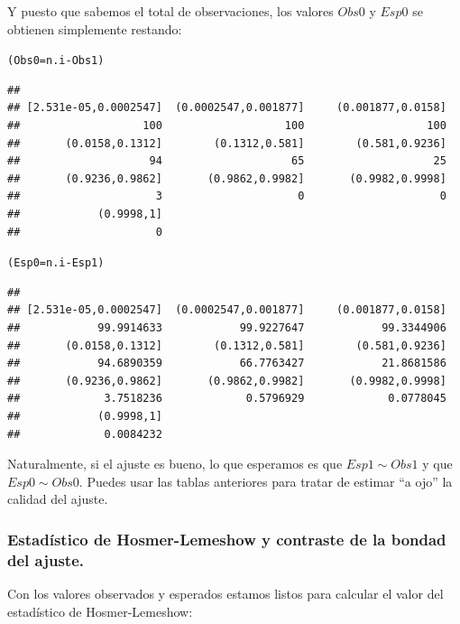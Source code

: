 \documentclass[10pt,a4paper]{article}\usepackage[]{graphicx}\usepackage[]{color}
\makeatletter
\newcommand{\hlopt}[1]{\textcolor[rgb]{0,0,0}{#1}}%
\newcommand{\hlstd}[1]{\textcolor[rgb]{0.345,0.345,0.345}{#1}}%
\newcommand{\hlkwb}[1]{\textcolor[rgb]{0.69,0.353,0.396}{#1}}%
\newenvironment{kframe}{%
 \def\at@end@of@kframe{}%
 \ifinner\ifhmode%
  \def\at@end@of@kframe{\end{minipage}}%
  \begin{minipage}{\columnwidth}%
 \fi\fi%
 \def\FrameCommand##1{\hskip\@totalleftmargin \hskip-\fboxsep
 \colorbox{shadecolor}{##1}\hskip-\fboxsep
     \hskip-\linewidth \hskip-\@totalleftmargin \hskip\columnwidth}%
 \MakeFramed {\advance\hsize-\width
   \@totalleftmargin\z@ \linewidth\hsize
   \@setminipage}}%
 {\par\unskip\endMakeFramed%
 \at@end@of@kframe}
\newenvironment{knitrout}{}{} %
\newcounter {cont01}
\makeatother
\begin{document}
Y puesto que sabemos el total de observaciones, los valores $Obs0$ y $Esp0$ se obtienen simplemente restando:

\begin{knitrout}
\color{fgcolor}\begin{kframe}
\begin{alltt}
\hlstd{(Obs0} \hlkwb{=} \hlstd{n.i} \hlopt{-} \hlstd{Obs1)}
\end{alltt}
\begin{verbatim}
## 
## [2.531e-05,0.0002547]  (0.0002547,0.001877]     (0.001877,0.0158] 
##                   100                   100                   100 
##       (0.0158,0.1312]        (0.1312,0.581]        (0.581,0.9236] 
##                    94                    65                    25 
##       (0.9236,0.9862]       (0.9862,0.9982]       (0.9982,0.9998] 
##                     3                     0                     0 
##            (0.9998,1] 
##                     0
\end{verbatim}
\begin{alltt}
\hlstd{(Esp0} \hlkwb{=} \hlstd{n.i} \hlopt{-}\hlstd{Esp1)}
\end{alltt}
\begin{verbatim}
## 
## [2.531e-05,0.0002547]  (0.0002547,0.001877]     (0.001877,0.0158] 
##            99.9914633            99.9227647            99.3344906 
##       (0.0158,0.1312]        (0.1312,0.581]        (0.581,0.9236] 
##            94.6890359            66.7763427            21.8681586 
##       (0.9236,0.9862]       (0.9862,0.9982]       (0.9982,0.9998] 
##             3.7518236             0.5796929             0.0778045 
##            (0.9998,1] 
##             0.0084232
\end{verbatim}
\end{kframe}
\end{knitrout}




Naturalmente, si el ajuste es bueno, lo que esperamos es que $Esp1 \sim Obs1$ y que $Esp0\sim Obs0$. Puedes usar las tablas anteriores para tratar de estimar ``a ojo'' la calidad del ajuste.

\subsubsection*{Estadístico de Hosmer-Lemeshow y contraste de la bondad del ajuste.}

Con los valores observados y esperados estamos listos para calcular el valor del estadístico de Hosmer-Lemeshow:
\end{document}
